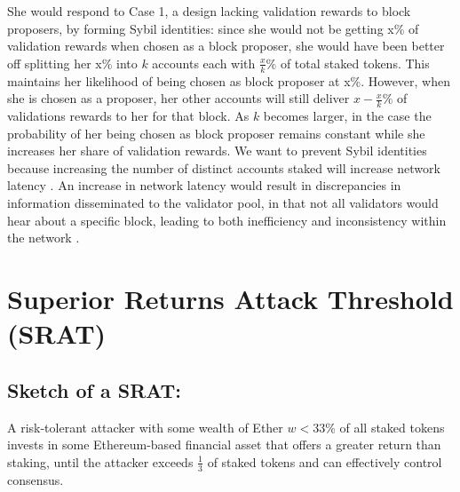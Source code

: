 \documentclass{article}
\renewcommand{\|}{\;|\;}
\begin{document}
She would respond to Case 1, a design lacking validation rewards to block proposers, by forming Sybil identities: since she would not be getting x\% of validation rewards when chosen as a block proposer, she would have been better off splitting her x\% into ${k}$ accounts each with $\frac{x}{k}\%$ of total staked tokens. This maintains her likelihood of being chosen as block proposer at x\%. However, when she is chosen as a proposer, her other accounts will still deliver $x-\frac{x}{k}\%$ of validations rewards to her for that block. As ${k}$ becomes larger, in the case the probability of her being chosen as block proposer remains constant while she increases her share of validation rewards.\newline \newline
We want to prevent Sybil identities because increasing the number of distinct accounts staked will increase network latency \cite{buterin17}. An increase in network latency would result in discrepancies in information disseminated to the validator pool, in that not all validators would hear about a specific block, leading to both inefficiency and inconsistency within the network \cite{Kwon2016}.

\section{Superior Returns Attack Threshold (SRAT)}

\subsection{Sketch of a SRAT:}
A risk-tolerant attacker with some wealth of Ether $w < 33$\% of all staked tokens invests in some Ethereum-based financial asset that offers a greater return than staking, until the attacker exceeds $\frac{1}{3}$ of staked tokens and can effectively control consensus.\newline
\end{document}
